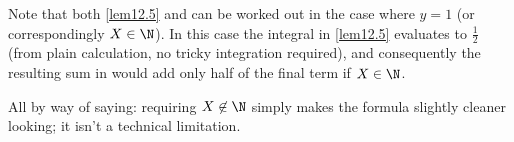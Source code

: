 \begin{remark}
	Note that both \autoref{lem12.5} and  can be worked out in the case where $y = 1$ (or correspondingly $X \in \N$).
	In this case the integral in \autoref{lem12.5} evaluates to $\frac{1}{2}$ (from plain calculation, no tricky integration required), and consequently the resulting sum in  would add only half of the final term if $X \in \N$.

	All by way of saying: requiring $X \not\in \N$ simply makes the formula slightly cleaner looking; it isn't a technical limitation.
\end{remark}
